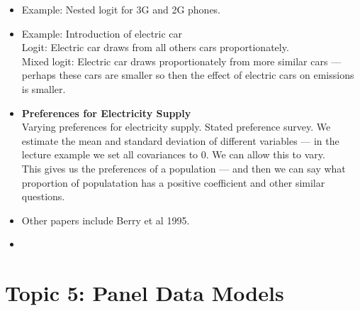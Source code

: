 \documentclass[12pt]{article}
\begin{document}
\begin{itemize}
      \item Example: Nested logit for 3G and 2G phones.
      \item Example: Introduction of electric car\\
            Logit: Electric car draws from all others cars proportionately.\\
            Mixed logit: Electric car draws proportionately from more similar cars --- perhaps these cars are smaller so then the effect of electric cars on emissions is smaller.
      \item \textbf{Preferences for Electricity Supply} \\
            Varying preferences for electricity supply. Stated preference survey.
            We estimate the mean and standard deviation of different variables --- in the lecture example we set all covariances to 0. We can allow this to vary. \\
            This gives us the preferences of a population --- and then we can say what proportion of populatation has a positive coefficient and other similar questions.
      \item Other papers include Berry et al 1995.
      \item


\end{itemize}



\section*{Topic 5: Panel Data Models}
\end{document}
